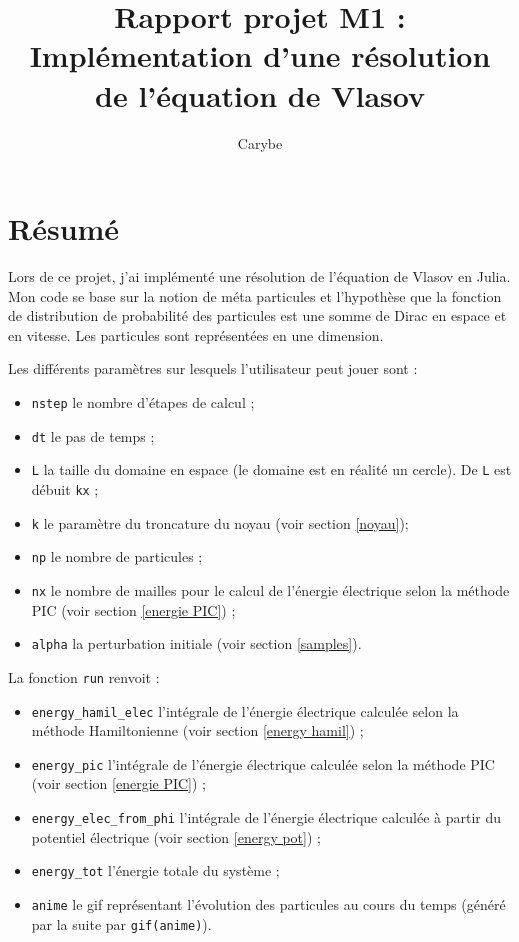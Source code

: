 \documentclass[a4paper,11pt]{article}
\title{Rapport projet M1 :\\Implémentation d'une résolution de l'équation de Vlasov}
\author{Carybe \bsc{Bégué}}
\newcommand{\Python}[1]{\texttt{#1}}
\begin{document}
\maketitle


\section{Résumé}

Lors de ce projet, j'ai implémenté une résolution de l'équation de Vlasov en Julia. Mon code se base sur la notion de méta particules et l'hypothèse que la fonction de distribution de probabilité des particules est une somme de Dirac en espace et en vitesse. Les particules sont représentées en une dimension. 

Les différents paramètres sur lesquels l'utilisateur peut jouer sont :
\begin{itemize}
	\item \Python{nstep} le nombre d'étapes de calcul ;
	\item \Python{dt} le pas de temps ;
	\item \Python{L} la taille du domaine en espace (le domaine est en réalité un cercle). De \Python{L} est débuit \Python{kx} ;
	\item \Python{k} le paramètre du troncature du noyau (voir section \ref{noyau});
	\item \Python{np} le nombre de particules ;
	\item \Python{nx} le nombre de mailles pour le calcul de l'énergie électrique selon la méthode PIC (voir section \ref{energie PIC}) ;
	\item \Python{alpha} la perturbation initiale (voir section \ref{samples}).
\end{itemize}

La fonction \Python{run} renvoit :
\begin{itemize}
	\item \Python{energy_hamil_elec} l'intégrale de l'énergie électrique calculée selon la méthode Hamiltonienne (voir section \ref{energy hamil}) ;
	\item \Python{energy_pic} l'intégrale de l'énergie électrique calculée selon la méthode PIC (voir section \ref{energie PIC}) ;
	\item \Python{energy_elec_from_phi} l'intégrale de l'énergie électrique calculée à partir du potentiel électrique (voir section \ref{energy pot}) ;
	\item \Python{energy_tot} l'énergie totale du système ;
	\item \Python{anime} le gif représentant l'évolution des particules au cours du temps (généré par la suite par \Python{gif(anime)}).
\end{itemize}
\end{document}
